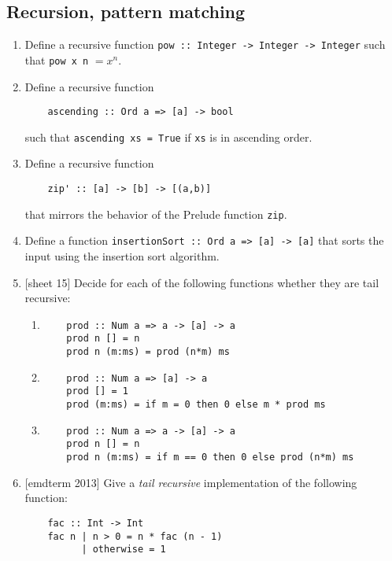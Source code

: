 \documentclass{article}
\begin{document}
\subsection{Recursion, pattern matching}
\begin{enumerate}
\item Define a recursive function \verb|pow :: Integer -> Integer -> Integer| such that \verb|pow x n| $= x^n$.

\item Define a recursive function
\begin{verbatim}
    ascending :: Ord a => [a] -> bool
\end{verbatim}
such that \verb|ascending xs = True| if \verb|xs| is in ascending order.

\item Define a recursive function
\begin{verbatim}
    zip' :: [a] -> [b] -> [(a,b)]
\end{verbatim}
that mirrors the behavior of the Prelude function \verb|zip|.

\item Define a function \verb|insertionSort :: Ord a => [a] -> [a]| that sorts the input using the insertion sort algorithm.

\item {[sheet 15]} Decide for each of the following functions whether they are tail recursive:
\begin{enumerate}
\item \begin{verbatim}
    prod :: Num a => a -> [a] -> a
    prod n [] = n
    prod n (m:ms) = prod (n*m) ms
\end{verbatim}
\item \begin{verbatim}
    prod :: Num a => [a] -> a
    prod [] = 1
    prod (m:ms) = if m = 0 then 0 else m * prod ms
\end{verbatim}
\item \begin{verbatim}
    prod :: Num a => a -> [a] -> a
    prod n [] = n
    prod n (m:ms) = if m == 0 then 0 else prod (n*m) ms
\end{verbatim}
\end{enumerate}

\item {[emdterm 2013]} Give a \textit{tail recursive} implementation of the following function:
\begin{verbatim}
    fac :: Int -> Int
    fac n | n > 0 = n * fac (n - 1)
          | otherwise = 1
\end{verbatim}


\end{enumerate}
\end{document}

